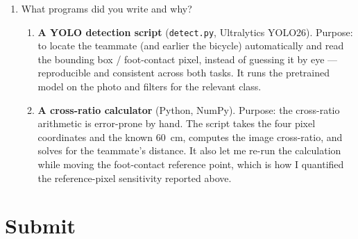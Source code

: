 \begin{enumerate}
\item What programs did you write and why?  
\begin{studentSpace}
\begin{enumerate}
\item \textbf{A YOLO detection script} (\texttt{detect.py}, Ultralytics
  YOLO26). Purpose: to locate the teammate (and earlier the bicycle)
  automatically and read the bounding box / foot-contact pixel, instead of
  guessing it by eye --- reproducible and consistent across both tasks. It
  runs the pretrained model on the photo and filters for the relevant
  class.
\item \textbf{A cross-ratio calculator} (Python, NumPy). Purpose: the
  cross-ratio arithmetic is error-prone by hand. The script takes the four
  pixel coordinates and the known 60~cm, computes the image cross-ratio,
  and solves for the teammate's distance. It also let me re-run the
  calculation while moving the foot-contact reference point, which is how I
  quantified the reference-pixel sensitivity reported above.
\end{enumerate}
\end{studentSpace}

\end{enumerate}

\section{Submit}

